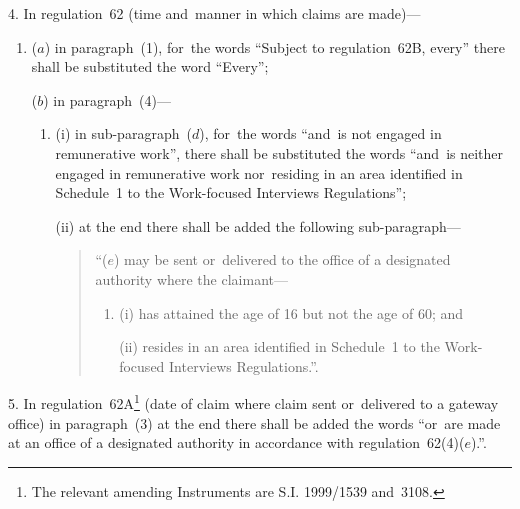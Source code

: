\documentclass[12pt,a4paper]{article}
\begin{document}
4.  In regulation~62 (time and~manner in which claims are made)—
\begin{enumerate}\item[]
($a$) in paragraph~(1), for~the words “Subject to regulation~62B, every” there shall be substituted the word “Every”;

($b$) in paragraph~(4)—
\begin{enumerate}\item[]
(i) in sub-paragraph~($d$), for~the words “and~is not engaged in remunerative work”, there shall be substituted the words “and~is neither engaged in remunerative work nor~residing in an area identified in Schedule~1 to the Work-focused Interviews Regulations”;

(ii) at the end there shall be added the following sub-paragraph—
\begin{quotation}
“($e$) may be sent or~delivered to the office of a designated authority where the claimant—
\begin{enumerate}\item[]
(i) has attained the age of 16 but not the age of 60; and

(ii) resides in an area identified in Schedule~1 to the Work-focused Interviews Regulations.”.
\end{enumerate}
\end{quotation}
\end{enumerate}
\end{enumerate}

\medskip

5.  In regulation~62A\footnote{\frenchspacing The relevant amending Instruments are S.I. 1999/1539 and~3108.} (date of claim where claim sent or~delivered to a gateway office) in paragraph~(3) at the end there shall be added the words “or~are made at an office of a designated authority in accordance with regulation~62(4)($e$).”.

\medskip
\end{document}
